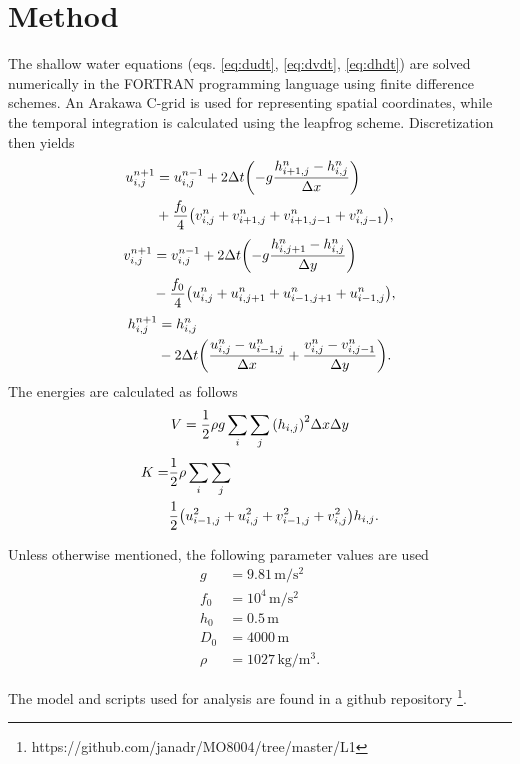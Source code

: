 \section{Method}
\label{sec:method}
The shallow water equations (eqs. \ref{eq:dudt}, \ref{eq:dvdt}, \ref{eq:dhdt}) are solved numerically in the FORTRAN programming language using finite difference schemes. An Arakawa C-grid is used for representing spatial coordinates, while the temporal integration is calculated using the leapfrog scheme. Discretization then yields
	\begin{align}
		u^{n+1}_{i,j} &= u^{n-1}_{i,j} + 2\Delta t \qty(-g\frac{h^n_{i+1,j} - h^n_{i,j}}{\Delta x}) \nonumber \\
		&+ \frac{f_0}{4}\qty(v^n_{i,j} + v^n_{i+1,j} + v^n_{i+1,j-1} + v^n_{i,j-1}),
	\label{eq:u_discrete}
	\end{align}
	\begin{align}
		v^{n+1}_{i,j} &= v^{n-1}_{i,j} + 2\Delta t \qty(-g\frac{h^n_{i,j+1} - h^n_{i,j}}{\Delta y}) \nonumber \\
		&- \frac{f_0}{4}\qty(u^n_{i,j} + u^n_{i,j+1} + u^n_{i-1,j+1} + u^n_{i-1,j}),
	\label{eq:v_discrete}
	\end{align}
	\begin{align}
		h^{n+1}_{i,j} &= h^{n}_{i,j} \nonumber  \\
		&- 2\Delta t \qty(\frac{u^n_{i,j} - u^n_{i-1,j}}{\Delta x} + \frac{v^n_{i,j} - v^n_{i,j-1}}{\Delta y}).
	\label{eq:h_discrete}
	\end{align}
The energies are calculated as follows
	\begin{equation}
		V = \frac{1}{2}\rho g \sum_i \sum_j \qty(h_{i,j})^2 \Delta x \Delta y
	\label{eq:potential_discrete}
	\end{equation}
	\begin{align}
		K = &\frac{1}{2} \rho \sum_i \sum_j \nonumber \\
		&\frac{1}{2} \qty(u^2_{i-1,j} + u^2_{i,j} + v^2_{i-1,j} + v^2_{i,j})h_{i,j}.
	\end{align}

Unless otherwise mentioned, the following parameter values are used
	\begin{align*}
		g &= 9.81\, \text{m} / \text{s}^2 \\
		f_0 &= 10^4\, \text{m} / \text{s}^2 \\
		h_0 &= 0.5\, \text{m} \\
		D_0 &= 4000\, \text{m} \\
		\rho &= 1027\, \text{kg} / \text{m}^3.
	\end{align*}

The model and scripts used for analysis are found in a github repository \footnote{https://github.com/janadr/MO8004/tree/master/L1}.